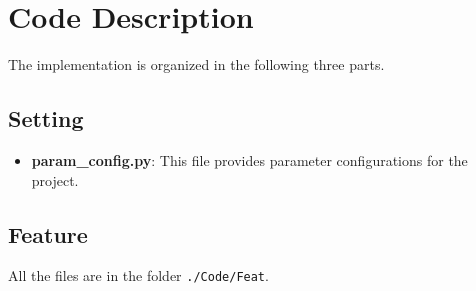 \documentclass[12pt]{article}
\begin{document}
\section{Code Description}
The implementation is organized in the following three parts.

\subsection{Setting}
\begin{itemize}
\item \textbf{param\_config.py}: This file provides parameter configurations for the project.
\end{itemize}

\subsection{Feature}
All the files are in the folder \texttt{./Code/Feat}.
\end{document}
